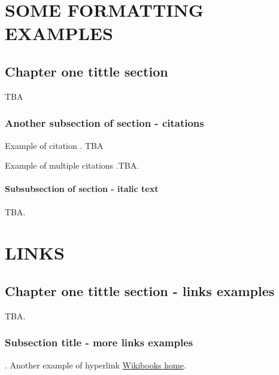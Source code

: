 \addchapheadtotoc
\chapter{SOME FORMATTING EXAMPLES}
\section{Chapter one tittle section}
TBA
\subsection{Another subsection of section - citations}
Example of citation \cite{altschul1997gapped}. TBA


Example of multiple citations \cite{altschul1997gapped, baker2007novel}.TBA.
\subsubsection{Subsubsection of section - italic text}
TBA.

\chapter{LINKS}
\section{Chapter one tittle section - links examples}
TBA.
\subsection{Subsection title - more links examples}.
Another example of hyperlink \href{http://www.wikibooks.org}{Wikibooks home}.